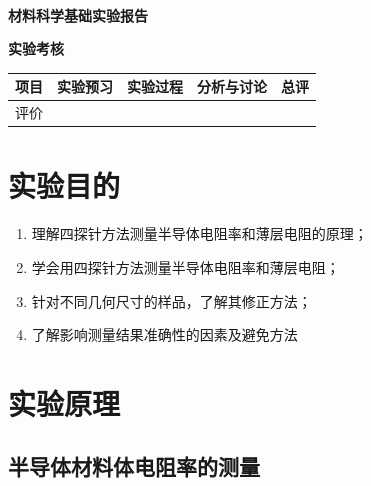 \documentclass[a4paper,utf8]{article}
\begin{document}
\begin{center}
    {\mbox{}\\[7em]\bfseries\songti%
    材料科学基础实验报告}\\[34mm]
    {\bfseries\songti
    实验考核\\[3mm]
    \extrarowheight=3mm
    \begin{tabularx}{150mm}{|X|X|X|X|X|}\hline
        \hfil 项目 \hfil  & \hfil 实验预习 \hfil & \hfil 实验过程 \hfil & \hfil 分析与讨论 \hfil & \hfil 总评 \hfil \\[3mm] \hline
        \hfil 评价 \hfil &  &  &  &  \\[3mm] \hline
    \end{tabularx}
    }
\end{center}
\newpage
\section{实验目的}
    \begin{enumerate}
        \item 理解四探针方法测量半导体电阻率和薄层电阻的原理；
        \item 学会用四探针方法测量半导体电阻率和薄层电阻；
        \item 针对不同几何尺寸的样品，了解其修正方法；
        \item 了解影响测量结果准确性的因素及避免方法
    \end{enumerate}
\section{实验原理}%
    \subsection{半导体材料体电阻率的测量}
\end{document}
